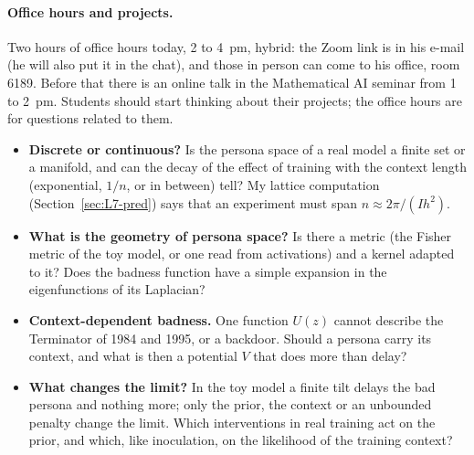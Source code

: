 \paragraph{Office hours and projects.}
Two hours of office hours today, 2 to 4~pm, hybrid: the Zoom link is in his e-mail (he will also put it in the chat), and those in person can come to his office, room 6189\flag. Before that there is an online talk in the Mathematical AI seminar from 1 to 2~pm. Students should start thinking about their projects; the office hours are for questions related to them.

\begin{openq}
\begin{itemize}
  \item \textbf{Discrete or continuous?} Is the persona space of a real model a finite set or a manifold, and can the decay of the effect of training with the context length (exponential, $1/n$, or in between) tell? My lattice computation (Section~\ref{sec:L7-pred}) says that an experiment must span $n\approx2\pi/(Ih^2)$.
  \item \textbf{What is the geometry of persona space?} Is there a metric (the Fisher metric of the toy model, or one read from activations) and a kernel adapted to it? Does the badness function have a simple expansion in the eigenfunctions of its Laplacian?
  \item \textbf{Context-dependent badness.} One function $U(z)$ cannot describe the Terminator of 1984 and 1995, or a backdoor. Should a persona carry its context, and what is then a potential $V$ that does more than delay?
  \item \textbf{What changes the limit?} In the toy model a finite tilt delays the bad persona and nothing more; only the prior, the context or an unbounded penalty change the limit. Which interventions in real training act on the prior, and which, like inoculation, on the likelihood of the training context?
\end{itemize}
\end{openq}

